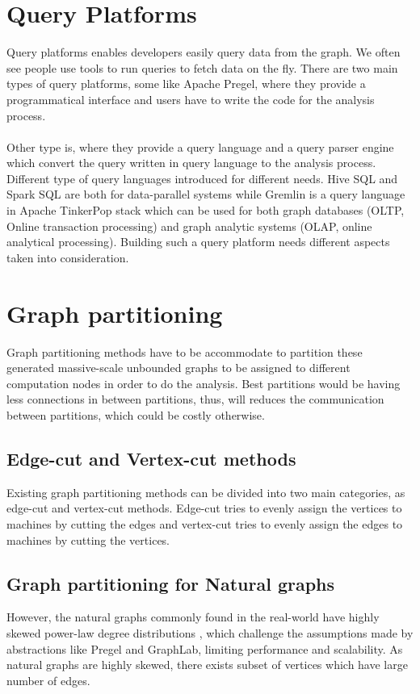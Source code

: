 \documentclass[12pt]{report}
\numberwithin{figure}{section}
\numberwithin{table}{section}
\begin{document}
\section{Query Platforms}
Query platforms enables developers easily query data from the graph. We often see people use tools to run queries to fetch data on the fly. There are two main types of query platforms, some like Apache Pregel, where they provide a programmatical interface and users have to write the code for the analysis process. 

\paragraph{}

Other type is, where they provide a query language and a query parser engine which convert the query written in query language to the analysis process. Different type of query languages introduced for different needs. Hive SQL and Spark SQL are both for data-parallel systems while Gremlin is a query language in Apache TinkerPop stack which can be used for both graph databases (OLTP, Online transaction processing) and graph analytic systems (OLAP, online analytical processing). Building such a query platform needs different aspects taken into consideration. 

\section{Graph partitioning}
Graph partitioning methods have to be accommodate to partition these generated massive-scale unbounded graphs to be assigned to  different computation nodes in order to do the analysis. Best partitions would be having less connections in between partitions, thus, will reduces the communication between partitions, which could be costly otherwise.

\subsection{Edge-cut and Vertex-cut methods}
Existing graph partitioning methods can be divided into two main categories, as edge-cut and vertex-cut methods\cite{S-PowerGraph}. Edge-cut tries to evenly assign the vertices to machines by cutting the edges and vertex-cut tries to evenly assign the edges to machines by cutting the vertices.
 
\subsection{Graph partitioning for Natural graphs}
However, the natural graphs commonly found in the real-world have highly skewed power-law degree distributions \cite{powerLaw1} \cite{powerLaw2}, which challenge the assumptions made by abstractions like  Pregel\cite{Pregel} and GraphLab\cite{Graphlab}, limiting performance and scalability. As natural graphs are highly skewed, there exists subset of vertices which have large number of edges. 
\end{document}
